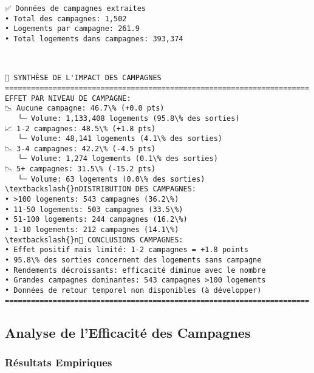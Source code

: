 \documentclass[11pt]{article}
\begin{document}
    \begin{Verbatim}[commandchars=\\\{\}]
✅ Données de campagnes extraites
• Total des campagnes: 1,502
• Logements par campagne: 261.9
• Total logements dans campagnes: 393,374
    \end{Verbatim}

    \begin{center}
    \end{center}
    { \hspace*{\fill} \\}
    
    \begin{Verbatim}[commandchars=\\\{\}]
📧 SYNTHÈSE DE L'IMPACT DES CAMPAGNES
======================================================================
EFFET PAR NIVEAU DE CAMPAGNE:
📉 Aucune campagne: 46.7\% (+0.0 pts)
   └─ Volume: 1,133,408 logements (95.8\% des sorties)
📈 1-2 campagnes: 48.5\% (+1.8 pts)
   └─ Volume: 48,141 logements (4.1\% des sorties)
📉 3-4 campagnes: 42.2\% (-4.5 pts)
   └─ Volume: 1,274 logements (0.1\% des sorties)
📉 5+ campagnes: 31.5\% (-15.2 pts)
   └─ Volume: 63 logements (0.0\% des sorties)
\textbackslash{}nDISTRIBUTION DES CAMPAGNES:
• >100 logements: 543 campagnes (36.2\%)
• 11-50 logements: 503 campagnes (33.5\%)
• 51-100 logements: 244 campagnes (16.2\%)
• 1-10 logements: 212 campagnes (14.1\%)
\textbackslash{}n🎯 CONCLUSIONS CAMPAGNES:
• Effet positif mais limité: 1-2 campagnes = +1.8 points
• 95.8\% des sorties concernent des logements sans campagne
• Rendements décroissants: efficacité diminue avec le nombre
• Grandes campagnes dominantes: 543 campagnes >100 logements
• Données de retour temporel non disponibles (à développer)
======================================================================
    \end{Verbatim}

    \subsection{Analyse de l'Efficacité des
Campagnes}\label{analyse-de-lefficacituxe9-des-campagnes}

\subsubsection{Résultats Empiriques}\label{ruxe9sultats-empiriques}
\end{document}
